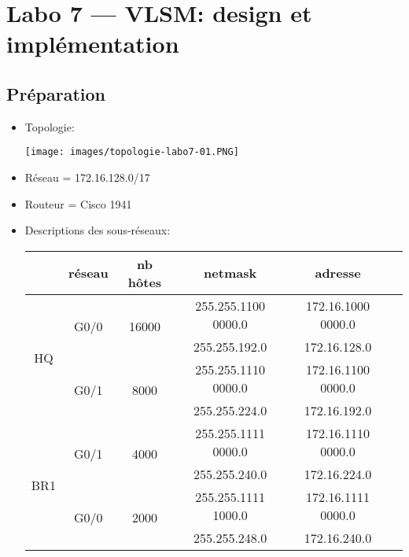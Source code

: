 \documentclass[a4paper]{article}
\begin{document}
\section{Labo 7 --- VLSM: design et implémentation}










\subsection{Préparation}





\begin{itemize}





\item Topologie:
\begin{center}
    \texttt{[image: images/topologie-labo7-01.PNG]}
\end{center}





\item Réseau = 172.16.128.0/17





\item Routeur = Cisco 1941





\item Descriptions des sous-réseaux:
\begin{center}
    \begin{tabular}{|c|c|c|c|c|c|} \hline
        & réseau & nb hôtes & netmask & adresse \\ \hline

        \multirow{4}{*}{HQ}
        & \multirow{2}{*}{G0/0} & \multirow{2}{*}{16000}
        & 255.255.1100 0000.0 & 172.16.1000 0000.0 \\
        &&& 255.255.192.0 & 172.16.128.0 \\
        & \multirow{2}{*}{G0/1} & \multirow{2}{*}{8000}
        & 255.255.1110 0000.0 & 172.16.1100 0000.0 \\
        &&& 255.255.224.0 & 172.16.192.0 \\ \hline

        \multirow{4}{*}{BR1}
        & \multirow{2}{*}{G0/1} & \multirow{2}{*}{4000}
        & 255.255.1111 0000.0 & 172.16.1110 0000.0 \\
        &&& 255.255.240.0 & 172.16.224.0 \\
        & \multirow{2}{*}{G0/0} & \multirow{2}{*}{2000}
        & 255.255.1111 1000.0 & 172.16.1111 0000.0 \\ 
        &&& 255.255.248.0 & 172.16.240.0 \\ \hline


\end{tabular}
\end{center}
\end{itemize}
\end{document}
